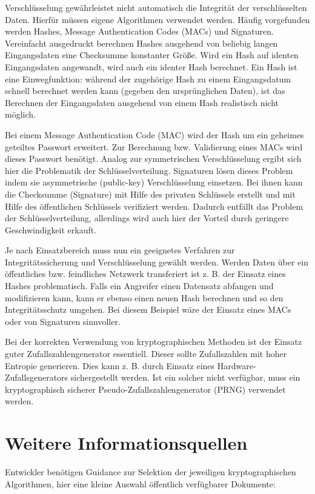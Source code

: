 Verschlüsselung gewährleistet nicht automatisch die Integrität der verschlüsselten Daten. Hierfür müssen eigene Algorithmen verwendet werden. Häufig vorgefunden werden Hashes, Message Authentication Codes (MACs) und Signaturen. Vereinfacht ausgedruckt berechnen Hashes ausgehend von beliebig langen Eingangsdaten eine Checksumme konstanter Größe. Wird ein Hash auf identen Eingangsdaten angewandt, wird auch ein identer Hash berechnet. Ein Hash ist eine Einwegfunktion: während der zugehörige Hash zu einem Eingangsdatum schnell berechnet werden kann (gegeben den ursprünglichen Daten), ist das Berechnen der Eingangsdaten ausgehend von einem Hash realistisch nicht möglich.

Bei einem Message Authentication Code (MAC) wird der Hash um ein geheimes geteiltes Passwort erweitert. Zur Berechnung bzw. Validierung eines MACs wird dieses Passwort benötigt. Analog zur symmetrischen Verschlüsselung ergibt sich hier die Problematik der Schlüsselverteilung. Signaturen lösen dieses Problem indem sie asymmetrische (public-key) Verschlüsselung einsetzen. Bei ihnen kann die Checksumme (Signature) mit Hilfe des privaten Schlüssels erstellt und mit Hilfe des öffentlichen Schlüssels verifiziert werden. Dadurch entfällt das Problem der Schlüsselverteilung, allerdings wird auch hier der Vorteil durch geringere Geschwindigkeit erkauft.

Je nach Einsatzbereich muss nun ein geeignetes Verfahren zur Integritätssicherung und Verschlüsselung gewählt werden. Werden Daten über ein öffentliches bzw. feindliches Netzwerk transferiert ist z. B. der Einsatz eines Hashes problematisch. Falls ein Angreifer einen Datensatz abfangen und modifizieren kann, kann er ebenso einen neuen Hash berechnen und so den Integritätsschutz umgehen. Bei diesem Beispiel wäre der Einsatz eines MACs oder von Signaturen sinnvoller.

Bei der korrekten Verwendung von kryptographischen Methoden ist der Einsatz guter Zufallszahlengenerator essentiell. Dieser sollte Zufallszahlen mit hoher Entropie generieren. Dies kann z. B. durch Einsatz eines Hardware-Zufallsgenerators sichergestellt werden. Ist ein solcher nicht verfügbar, muss ein kryptographisch sicherer Pseudo-Zufallszahlengenerator (PRNG) verwendet werden.

\section{Weitere Informationsquellen}

Entwickler benötigen Guidance zur Selektion der jeweiligen kryptographischen Algorithmen, hier eine kleine Auswahl öffentlich verfügbarer Dokumente:

